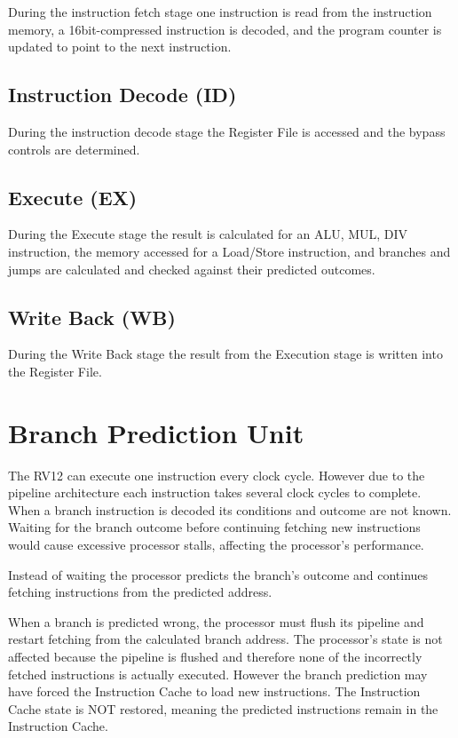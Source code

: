 During the instruction fetch stage one instruction is read from the
instruction memory, a 16bit-compressed instruction is decoded, and the
program counter is updated to point to the next instruction.

\subsection{Instruction Decode (ID)}\label{instruction-decode-id}

During the instruction decode stage the Register File is accessed and
the bypass controls are determined.

\subsection{Execute (EX)}\label{execute-ex}

During the Execute stage the result is calculated for an
ALU, MUL, DIV instruction, the memory accessed for a Load/Store instruction, and branches and jumps are calculated and checked against their predicted outcomes.

\subsection{Write Back (WB)}\label{write-back-wb}

During the Write Back stage the result from the Execution stage is written into the Register
File.

\section{Branch Prediction Unit}\label{branch-prediction-unit}

The RV12 can execute one instruction every clock cycle. However due to
the pipeline architecture each instruction takes several clock cycles to
complete. When a branch instruction is decoded its conditions and
outcome are not known. Waiting for the branch outcome before continuing
fetching new instructions would cause excessive processor stalls,
affecting the processor's performance.

Instead of waiting the processor predicts the branch's outcome and
continues fetching instructions from the predicted address.

When a branch is predicted wrong, the processor must flush its pipeline
and restart fetching from the calculated branch address. The processor's
state is not affected because the pipeline is flushed and therefore none
of the incorrectly fetched instructions is actually executed. However
the branch prediction may have forced the Instruction Cache to load new
instructions. The Instruction Cache state is NOT restored, meaning the
predicted instructions remain in the Instruction Cache.

